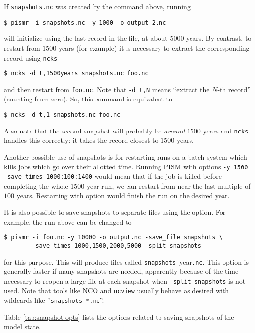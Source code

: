 If \verb|snapshots.nc| was created by the command above, running
\begin{verbatim}
$ pismr -i snapshots.nc -y 1000 -o output_2.nc
\end{verbatim}
will initialize using the last record in the file, at about $5000$ years.  By contrast, to restart from $1500$ years (for example) it is necessary to extract the corresponding record using \verb|ncks|
\begin{verbatim}
$ ncks -d t,1500years snapshots.nc foo.nc
\end{verbatim}
and then restart from \verb|foo.nc|.  Note that \verb|-d t,N| means ``extract the $N$-th record'' (counting from zero).  So, this command is equivalent to
\begin{verbatim}
$ ncks -d t,1 snapshots.nc foo.nc
\end{verbatim}
Also note that the second snapshot will probably be \emph{around} $1500$ years and \verb|ncks| handles this correctly: it takes the record closest to $1500$ years.

Another possible use of snapshots is for restarting runs on a batch system which kills jobs which go over their allotted time.  Running PISM with options \verb|-y 1500| \verb|-save_times 1000:100:1400| would mean that if the job is killed before completing the whole 1500 year run, we can restart from near the last multiple of $100$ years.  Restarting with option  would finish the run on the desired year.

It is also possible to save snapshots to separate files using the
 option.  For example, the run above can be changed to
\begin{verbatim}
$ pismr -i foo.nc -y 10000 -o output.nc -save_file snapshots \
        -save_times 1000,1500,2000,5000 -split_snapshots
\end{verbatim}
for this purpose.  This will produce files called \verb|snapshots-|year\verb|.nc|.  This option is generally faster if many snapshots are needed, apparently because of the time necessary to reopen a large file at each snapshot when \verb|-split_snapshots| is not used.  Note that tools like NCO and \verb|ncview| usually behave as desired with wildcards like ``\verb|snapshots-*.nc|''.

Table \ref{tab:snapshot-opts} lists the options related to saving snapshots of the model state.

